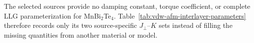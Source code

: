 The selected sources provide no damping constant, torque coefficient, or
complete LLG parameterization for MnBi$_2$Te$_4$.  Table~\ref{tab:vdw-afm-interlayer-parameters}
therefore records only its two source-specific $J_\perp$--$K$ sets instead of
filling the missing quantities from another material or model.
